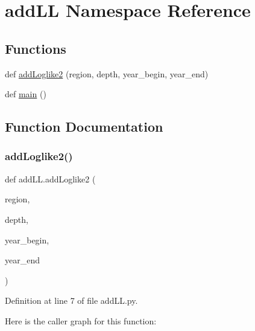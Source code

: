 \hypertarget{namespaceadd_l_l}{}\section{add\+LL Namespace Reference}
\label{namespaceadd_l_l}
\subsection*{Functions}
\begin{DoxyCompactItemize}
\item 
def \hyperlink{namespaceadd_l_l_aa96a722d0234136b34ff4a5e5cd181d0}{add\+Loglike2} (region, depth, year\+\_\+begin, year\+\_\+end)
\item 
def \hyperlink{namespaceadd_l_l_a81cabc4a4a81cb2c54417df2d6eedb3a}{main} ()
\end{DoxyCompactItemize}


\subsection{Function Documentation}
\mbox{\label{namespaceadd_l_l_aa96a722d0234136b34ff4a5e5cd181d0}} 
\subsubsection{\texorpdfstring{add\+Loglike2()}{addLoglike2()}}
{\footnotesize\ttfamily def add\+L\+L.\+add\+Loglike2 (\begin{DoxyParamCaption}\item[{}]{region,  }\item[{}]{depth,  }\item[{}]{year\+\_\+begin,  }\item[{}]{year\+\_\+end }\end{DoxyParamCaption})}



Definition at line 7 of file add\+L\+L.\+py.

Here is the caller graph for this function\+:
